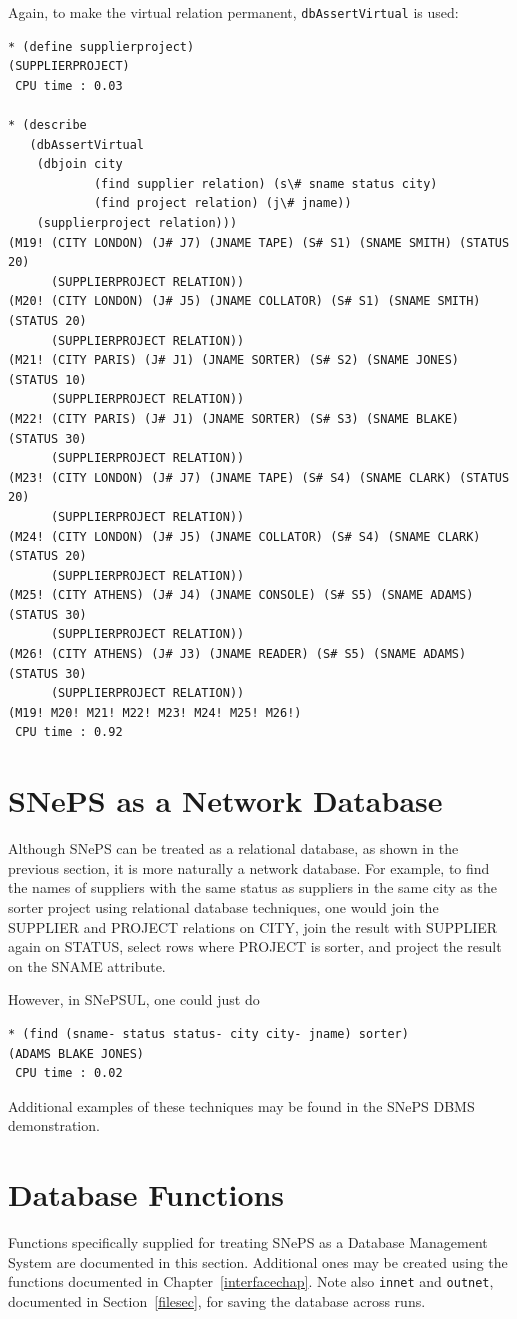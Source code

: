 \documentclass{book}
\begin{document}
Again, to make the virtual relation permanent, {\tt dbAssertVirtual}
is used:
\begin{verbatim}
* (define supplierproject)
(SUPPLIERPROJECT)
 CPU time : 0.03 

* (describe
   (dbAssertVirtual
    (dbjoin city
            (find supplier relation) (s\# sname status city)
            (find project relation) (j\# jname))
    (supplierproject relation)))
(M19! (CITY LONDON) (J# J7) (JNAME TAPE) (S# S1) (SNAME SMITH) (STATUS 20)
      (SUPPLIERPROJECT RELATION))
(M20! (CITY LONDON) (J# J5) (JNAME COLLATOR) (S# S1) (SNAME SMITH) (STATUS 20)
      (SUPPLIERPROJECT RELATION))
(M21! (CITY PARIS) (J# J1) (JNAME SORTER) (S# S2) (SNAME JONES) (STATUS 10)
      (SUPPLIERPROJECT RELATION))
(M22! (CITY PARIS) (J# J1) (JNAME SORTER) (S# S3) (SNAME BLAKE) (STATUS 30)
      (SUPPLIERPROJECT RELATION))
(M23! (CITY LONDON) (J# J7) (JNAME TAPE) (S# S4) (SNAME CLARK) (STATUS 20)
      (SUPPLIERPROJECT RELATION))
(M24! (CITY LONDON) (J# J5) (JNAME COLLATOR) (S# S4) (SNAME CLARK) (STATUS 20)
      (SUPPLIERPROJECT RELATION))
(M25! (CITY ATHENS) (J# J4) (JNAME CONSOLE) (S# S5) (SNAME ADAMS) (STATUS 30)
      (SUPPLIERPROJECT RELATION))
(M26! (CITY ATHENS) (J# J3) (JNAME READER) (S# S5) (SNAME ADAMS) (STATUS 30)
      (SUPPLIERPROJECT RELATION))
(M19! M20! M21! M22! M23! M24! M25! M26!)
 CPU time : 0.92 
\end{verbatim}


\section{SNePS as a Network Database}
Although SNePS can be treated as a relational database, as shown in
the previous section, it is more naturally a network database.  For
example, to find the names of suppliers with the same status as
suppliers in the same city as the sorter project using relational
database techniques, one would join the SUPPLIER and PROJECT relations
on CITY, join the result with SUPPLIER again on STATUS, select rows
where PROJECT is sorter, and project the result on the SNAME
attribute.

However, in SNePSUL, one could just do
\begin{verbatim}
* (find (sname- status status- city city- jname) sorter)
(ADAMS BLAKE JONES)
 CPU time : 0.02 
\end{verbatim}
Additional examples of these techniques may be found in the SNePS DBMS
demonstration.

\section{Database Functions}
Functions specifically supplied for treating SNePS as a Database
Management System are documented in this section.  Additional ones may
be created using the functions documented in
Chapter~\ref{interfacechap}.  Note also {\tt innet} and {\tt outnet},
documented in Section~\ref{filesec}, for saving the database across
runs.
\end{document}
